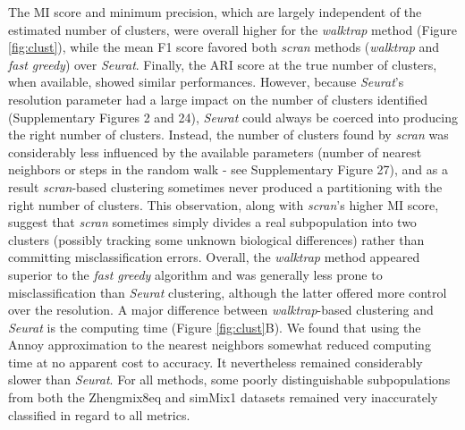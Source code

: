 \documentclass{bmcart}
\begin{document}
The MI score and minimum precision, which are largely independent of the estimated number of clusters, were overall higher for the \textit{walktrap} method (Figure \ref{fig:clust}), while the mean F1 score favored both \textit{scran} methods (\textit{walktrap} and \textit{fast greedy}) over \textit{Seurat}. Finally, the ARI score at the true number of clusters, when available, showed similar performances. However, because \textit{Seurat}'s resolution parameter had a large impact on the number of clusters identified (Supplementary Figures 2 and 24), \textit{Seurat} could always be coerced into producing the right number of clusters. Instead, the number of clusters found by \textit{scran} was considerably less influenced by the available parameters (number of nearest neighbors or steps in the random walk - see Supplementary Figure 27), and as a result \textit{scran}-based clustering sometimes never produced a partitioning with the right number of clusters. This observation, along with \textit{scran}'s higher MI score, suggest that \textit{scran} sometimes simply divides a real subpopulation into two clusters (possibly tracking some unknown biological differences) rather than committing misclassification errors. Overall, the \textit{walktrap} method appeared superior to the \textit{fast greedy} algorithm and was generally less prone to misclassification than \textit{Seurat} clustering, although the latter offered more control over the resolution. A major difference between \textit{walktrap}-based clustering and \textit{Seurat} is the computing time (Figure \ref{fig:clust}B). We found that using the Annoy approximation to the nearest neighbors somewhat reduced computing time at no apparent cost to accuracy. It nevertheless remained considerably slower than \textit{Seurat}. For all methods, some poorly distinguishable subpopulations from both the Zhengmix8eq and simMix1 datasets remained very inaccurately classified in regard to all metrics.
\end{document}
